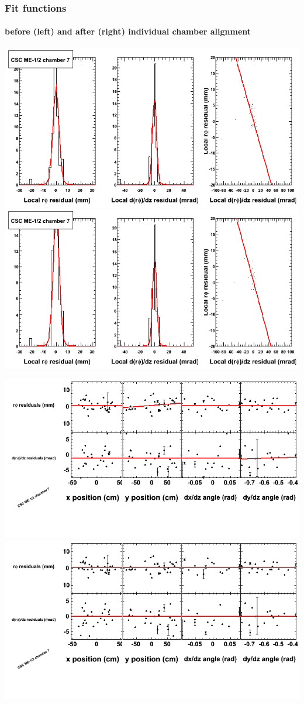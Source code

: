 \documentclass[compress]{beamer}
\begin{document}
\begin{frame}
\frametitle{Fit functions}
\framesubtitle{before (left) and after (right) individual chamber alignment}
\includegraphics[width=0.5\linewidth]{ringfits_3dof/beforefit_MEm12_07_bellcurve.png} \includegraphics[width=0.5\linewidth]{ringfits_3dof/afterfit_MEm12_07_bellcurve.png}

\includegraphics[width=0.5\linewidth]{ringfits_3dof/beforefit_MEm12_07_polynomials.png} \includegraphics[width=0.5\linewidth]{ringfits_3dof/afterfit_MEm12_07_polynomials.png}
\end{frame}
\end{document}
